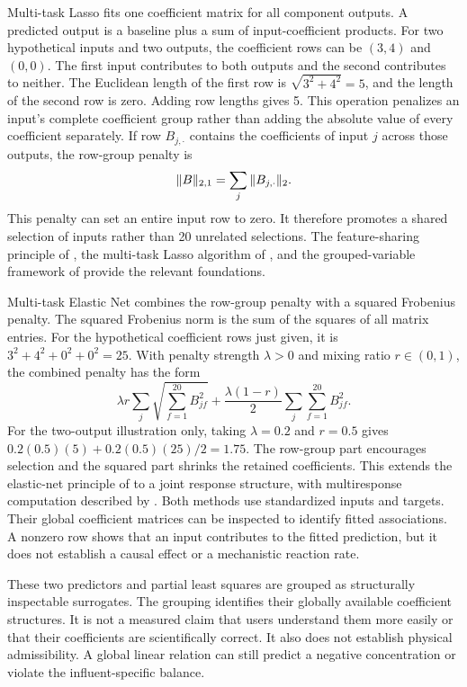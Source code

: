 Multi-task Lasso fits one coefficient matrix for all component outputs. A predicted output is a baseline plus a sum of input-coefficient products. For two hypothetical inputs and two outputs, the coefficient rows can be $(3,4)$ and $(0,0)$. The first input contributes to both outputs and the second contributes to neither. The Euclidean length of the first row is $\sqrt{3^2+4^2}=5$, and the length of the second row is zero. Adding row lengths gives 5. This operation penalizes an input's complete coefficient group rather than adding the absolute value of every coefficient separately. If row $B_{j,\cdot}$ contains the coefficients of input $j$ across those outputs, the row-group penalty is
\begin{equation}
\equationname{Row-group penalty for multiresponse regression coefficients}
\|B\|_{2,1}=\sum_j\|B_{j,\cdot}\|_2.
\label{eq:multiresponse_row_penalty}
\end{equation}
This penalty can set an entire input row to zero. It therefore promotes a shared selection of inputs rather than 20 unrelated selections. The feature-sharing principle of \citet{Argyriou2008}, the multi-task Lasso algorithm of \citet{Liu2009}, and the grouped-variable framework of \citet{Yuan2006} provide the relevant foundations.

Multi-task Elastic Net combines the row-group penalty with a squared Frobenius penalty. The squared Frobenius norm is the sum of the squares of all matrix entries. For the hypothetical coefficient rows just given, it is $3^2+4^2+0^2+0^2=25$. With penalty strength $\lambda>0$ and mixing ratio $r\in(0,1)$, the combined penalty has the form
\[
\lambda r\sum_j\sqrt{\sum_{f=1}^{20}B_{jf}^2}
+\frac{\lambda(1-r)}2\sum_j\sum_{f=1}^{20}B_{jf}^2.
\]
For the two-output illustration only, taking $\lambda=0.2$ and $r=0.5$ gives $0.2(0.5)(5)+0.2(0.5)(25)/2=1.75$. The row-group part encourages selection and the squared part shrinks the retained coefficients. This extends the elastic-net principle of \citet{Zou2005} to a joint response structure, with multiresponse computation described by \citet{Simon2013}. Both methods use standardized inputs and targets. Their global coefficient matrices can be inspected to identify fitted associations. A nonzero row shows that an input contributes to the fitted prediction, but it does not establish a causal effect or a mechanistic reaction rate.

These two predictors and partial least squares are grouped as structurally inspectable surrogates. The grouping identifies their globally available coefficient structures. It is not a measured claim that users understand them more easily or that their coefficients are scientifically correct. It also does not establish physical admissibility. A global linear relation can still predict a negative concentration or violate the influent-specific balance.

